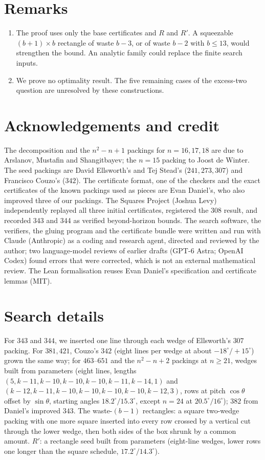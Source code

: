 \documentclass[11pt,letterpaper]{amsart}
\theoremstyle{plain}
\begin{document}
\section{Remarks}

\begin{enumerate}
\item The proof uses only the base certificates and $R$ and $R'$. A squeezable $(b+1) \times b$ rectangle of waste $b - 3$, or of waste $b - 2$ with $b \le 13$, would strengthen the bound. An analytic family could replace the finite search inputs.
\item We prove no optimality result. The five remaining cases of the excess-two question are unresolved by these constructions.
\end{enumerate}

\section*{Acknowledgements and credit}

The decomposition and the $n^2 - n + 1$ packings for $n = 16, 17, 18$ are due to Arslanov, Mustafin and Shangitbayev; the $n = 15$ packing to Joost de Winter. The seed packings are David Ellsworth's and Tej Stead's ($241, 273, 307$) and Francisco Couzo's ($342$). The certificate format, one of the checkers and the exact certificates of the known packings used as pieces are Evan Daniel's, who also improved three of our packings. The Squares Project (Joshua Levy) independently replayed all three initial certificates, registered the 308 result, and recorded 343 and 344 as verified beyond-horizon bounds. The search software, the verifiers, the gluing program and the certificate bundle were written and run with Claude (Anthropic) as a coding and research agent, directed and reviewed by the author; two language-model reviews of earlier drafts (GPT-6 Astra; OpenAI Codex) found errors that were corrected, which is not an external mathematical review. The Lean formalisation reuses Evan Daniel's specification and certificate lemmas (MIT).

\appendix

\section{Search details}

For $343$ and $344$, we inserted one line through each wedge of Ellsworth's $307$ packing. For $381, 421$, Couzo's $342$ (eight lines per wedge at about $-18^\circ/+15^\circ$) grown the same way; for $463$--$651$ and the $n^2 - n + 2$ packings at $n \ge 21$, wedges built from parameters (eight lines, lengths $(5, k-11, k-10, k-10, k-10, k-11, k-14, 1)$ and $(k-12, k-11, k-10, k-10, k-10, k-10, k-12, 3)$, rows at pitch $\cos\theta$ offset by $\sin\theta$, starting angles $18.2^\circ/15.3^\circ$, except $n = 24$ at $20.5^\circ/16^\circ$); $382$ from Daniel's improved $343$. The waste-$(b-1)$ rectangles: a square two-wedge packing with one more square inserted into every row crossed by a vertical cut through the lower wedge, then both sides of the box shrunk by a common amount. $R'$: a rectangle seed built from parameters (eight-line wedges, lower rows one longer than the square schedule, $17.2^\circ/14.3^\circ$).
\end{document}
